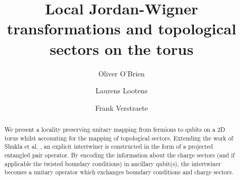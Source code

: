 \documentclass[aps,prl,twocolumn,floatfix,10pt,amssymb,amsfont,amsmath,superscriptaddress,float,nofootinbib,longbibliography,nobalancelastpage]{revtex4-2}
\begin{document}
\title{Local Jordan-Wigner transformations and topological sectors on the torus}

\author{Oliver O'Brien}
\author{Laurens Lootens}
\author{Frank Verstraete}




\begin{abstract}
We present a locality preserving unitary mapping from fermions to qubits on a 2D torus whilst accounting for the mapping of topological sectors. Extending the work of Shukla et al. \cite{Shukla_2020}, an explicit intertwiner is constructed in the form of a projected entangled pair operator. By encoding the information about the charge sectors (and if applicable the twisted boundary conditions) in ancillary qubit(s), the intertwiner becomes a  unitary operator which exchanges boundary conditions and charge sectors.
\end{abstract}


\maketitle
\end{document}
